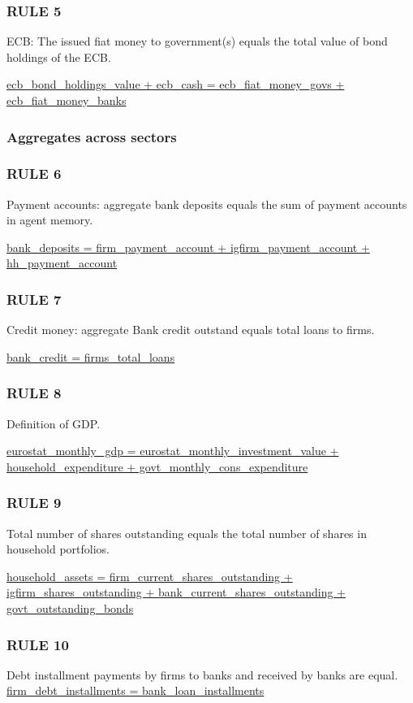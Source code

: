 \subsubsection*{RULE 5}
ECB: The issued fiat money to government(s) equals the total value of bond holdings of the ECB.

\bigskip
\url{ecb_bond_holdings_value + ecb_cash = ecb_fiat_money_govs + ecb_fiat_money_banks}

\subsubsection*{Aggregates across sectors}

\subsubsection*{RULE 6}
Payment accounts: aggregate bank deposits equals the sum of payment accounts in agent memory.

\bigskip
\url{bank_deposits = firm_payment_account + igfirm_payment_account + hh_payment_account}

\subsubsection*{RULE 7}
Credit money: aggregate Bank credit outstand equals total loans to firms.

\bigskip
\url{bank_credit = firms_total_loans}

\subsubsection*{RULE 8}
Definition of GDP.

\bigskip
\url{eurostat_monthly_gdp = eurostat_monthly_investment_value + household_expenditure + govt_monthly_cons_expenditure}

\subsubsection*{RULE 9}
Total number of shares outstanding equals the total number of shares in household portfolios.

\bigskip
\url{household_assets = firm_current_shares_outstanding + igfirm_shares_outstanding + bank_current_shares_outstanding + govt_outstanding_bonds}

\subsubsection*{RULE 10}
Debt installment payments by firms to banks and received by banks are equal.
\url{firm_debt_installments = bank_loan_installments}

